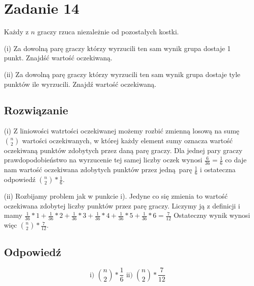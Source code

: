 \section{Zadanie 14}

Każdy z \(n\) graczy rzuca niezależnie od pozostałych kostki.

(i) Za dowolną parę graczy którzy wyrzucili ten sam wynik grupa dostaje 1 punkt. Znajdść wartość oczekiwaną.

(ii) Za dowolną parę graczy którzy wyrzucili ten sam wynik grupa dostaje tyle punktów ile wyrzucili. Znajdź wartość oczekiwaną.

\subsection*{Rozwiązanie}

(i) Z liniowości watrtości oczekiwanej możemy rozbić zmienną losową na sumę \(\binom{n}{2}\) wartości oczekiwanych, w której każdy element sumy oznacza wartość oczekiwaną punktów zdobytych przez daną parę graczy. Dla jednej pary graczy prawdopodobieństwo na wyrzucenie tej samej liczby oczek wynosi \(\frac{6}{36} = \frac{1}{6}\) co daje nam wartość oczekiwana zdobytych punktów przez jedną parę \(\frac{1}{6}\) i ostateczna odpowiedź \(\binom{n}{2} * \frac{1}{6}\).

(ii) Rozbijamy problem jak w punkcie i). Jedyne co się zmienia to wartość oczekiwana zdobytej liczby punktów przez parę graczy. Liczymy ją z definicji i mamy \(\frac{1}{36}*1 + \frac{1}{36}*2 + \frac{1}{36}*3 + \frac{1}{36}*4 + \frac{1}{36}*5 + \frac{1}{36}*6 = \frac{7}{12} \) Ostateczny wynik wynosi więc \(\binom{n}{2} * \frac{7}{12}\).


\subsection*{Odpowiedź}
\[
	\boxed{\text{i) \(\binom{n}{2} * \frac{1}{6}\) ii) \(\binom{n}{2} * \frac{7}{12}\)}}
\]